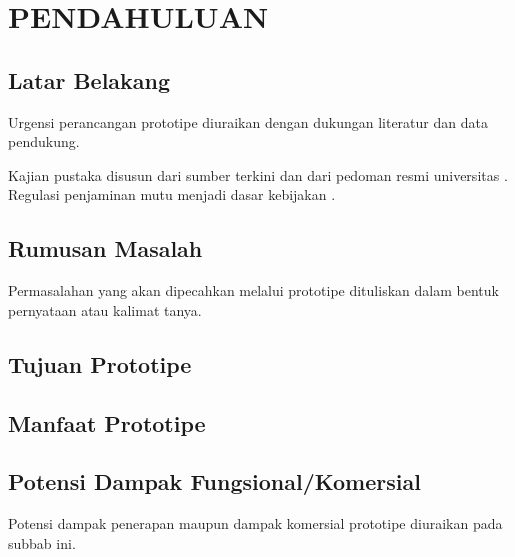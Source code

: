 \chapter{PENDAHULUAN}
\section{Latar Belakang}
Urgensi perancangan prototipe diuraikan dengan dukungan literatur dan data pendukung.

Kajian pustaka disusun dari sumber terkini \citep{creswell2018research, patten2017understanding}
dan dari pedoman resmi universitas \citep{unnes2024panduanakademik}. Regulasi penjaminan mutu
menjadi dasar kebijakan \citep{permendikbudristek2023}.

\section{Rumusan Masalah}
Permasalahan yang akan dipecahkan melalui prototipe dituliskan dalam bentuk pernyataan atau
kalimat tanya.

\section{Tujuan Prototipe}
\section{Manfaat Prototipe}
\section{Potensi Dampak Fungsional/Komersial}
Potensi dampak penerapan maupun dampak komersial prototipe diuraikan pada subbab ini.
